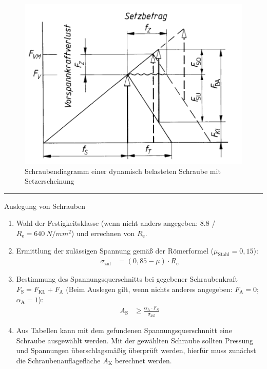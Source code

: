 \begin{figure}[H]
	\centering
	\includegraphics[width=0.8\linewidth]{schrauben/schraubendiagramm}
	\caption*{Schraubendiagramm einer dynamisch belasteten Schraube mit Setzerscheinung}
\end{figure}


\hrule
\begin{eeqn}{Auslegung von Schrauben}
	\begin{enumerate}[itemsep=0mm,leftmargin=12pt]
		\item Wahl der Festigkeitsklasse (wenn nicht anders angegeben: 8.8 / $R_\text{e}=\SI{640}{N/mm^2}$) und errechnen von $R_\text{e}$.
		\item Ermittlung der zulässigen Spannung gemäß der Römerformel ($\mu_\text{Stahl}=0,15$):
			\begin{align}
				\sigma_\text{zul} &= (0,85-\mu)\cdot R_\text{e}
			\end{align}
		\item Bestimmung des Spannungsquerschnitts bei gegebener Schraubenkraft $F_\text{S}=F_\text{KL}+F_\text{A}$ (Beim Auslegen gilt, wenn nichts anderes angegeben: $F_\text{A}=0$; $\alpha_\text{A}=1$):
			\begin{align}
				A_\text{S} &\geq \frac{\alpha_\text{A} \cdot F_\text{S}}{\sigma_\text{zul}}
			\end{align}
		\item Aus Tabellen kann mit dem gefundenen Spannungsquerschnnitt eine Schraube ausgewählt werden. Mit der gewählten Schraube sollten Pressung und Spannungen überschlagsmäßig überprüft werden, hierfür muss zunächst die Schraubenauflagefläche $A_\text{K}$ berechnet werden.
	\end{enumerate}
\end{eeqn}